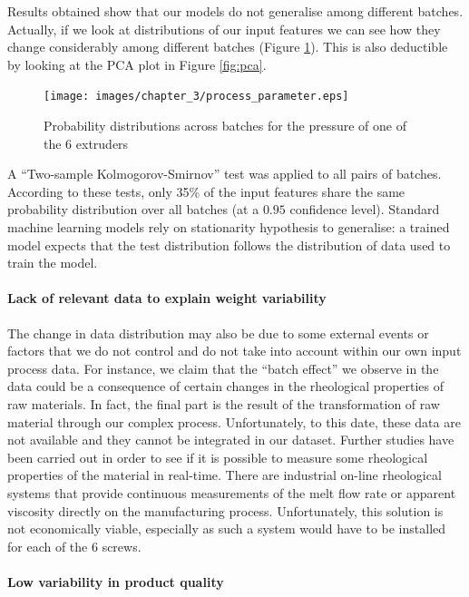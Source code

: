 Results obtained show that our models do not generalise among different batches. Actually, if we look at distributions of our input features we can see how they change considerably among different batches (Figure \ref{fig:Example of a process parameter variability in probability distribution}). This is also deductible by looking at the PCA plot in Figure \ref{fig:pca}.  
%
\begin{figure}
\centerline{\texttt{[image: images/chapter\_3/process\_parameter.eps]}}
\caption{Probability distributions across batches for the pressure of one of the 6 extruders}
\label{fig:Example of a process parameter variability in probability distribution}
\end{figure}
%
A ``Two-sample Kolmogorov-Smirnov'' test was applied to all pairs of batches. According to these tests, only 35\% of the input features share the same probability distribution over all batches (at a $0.95$ confidence level).
Standard machine learning models rely on stationarity hypothesis to generalise: a trained model expects that the test distribution follows the distribution of data used to train the model.

\paragraph{Lack of relevant data to explain weight variability}

The change in data distribution may also be due to some external events or factors that we do not control and do not take into account within our own input process data. For instance, we claim that the ``batch effect'' we observe in the data could be a consequence of certain changes in the rheological properties of raw materials. In fact, the final part is the result of the transformation of raw material through our complex process. Unfortunately, to this date, these data are not available and they cannot be integrated in our dataset. Further studies have been carried out in order to see if it is possible to measure some rheological properties of the material in real-time. There are industrial on-line rheological systems that provide continuous measurements of the melt flow rate or apparent viscosity directly on the manufacturing process. Unfortunately, this solution is not economically viable, especially as such a system would have to be installed for each of the 6 screws.

\paragraph{Low variability in product quality}

